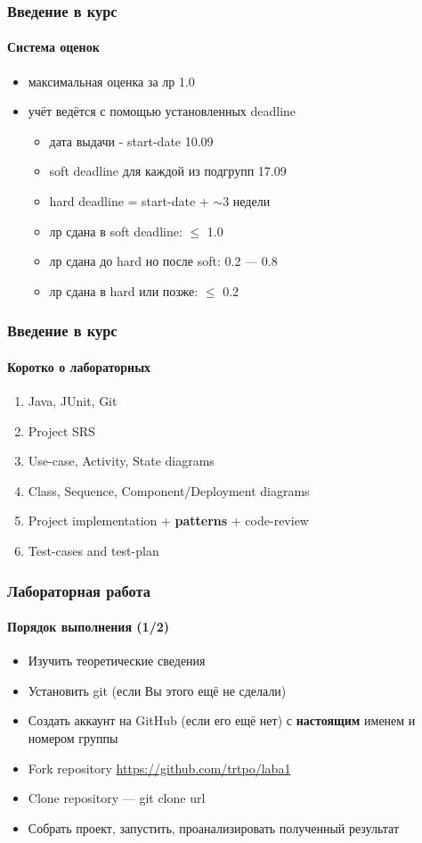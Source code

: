 \documentclass[aspectratio=169, 12pt]{beamer}
\begin{document}
\begin{frame}
    \frametitle{Введение в курс}
    \framesubtitle{Система оценок}
    \begin{itemize}
        \item максимальная оценка за лр 1.0 \pause
        \item учёт ведётся с помощью установленных deadline \pause
        \begin{itemize}
            \item дата выдачи - start-date 10.09 \pause
            \item soft deadline для каждой из подгрупп 17.09 \pause
            \item hard deadline = start-date + $\sim$3 недели \pause
            \item лр сдана в soft deadline: $\leq$ 1.0
            \item лр сдана до hard но после soft: 0.2 --- 0.8
            \item лр сдана в hard или позже: $\leq$ 0.2
        \end{itemize}
    \end{itemize}
\end{frame}

\begin{frame}
    \frametitle{Введение в курс}
    \framesubtitle{Коротко о лабораторных} \pause
    \begin{enumerate}
        \item Java, JUnit, Git \pause
        \item Project SRS \pause
        \item Use-case, Activity, State diagrams \pause
        \item Class, Sequence, Component/Deployment diagrams \pause
        \item Project implementation + \textbf{patterns} + code-review \pause
        \item Test-cases and test-plan
    \end{enumerate}
\end{frame}

\begin{frame}[t]
    \frametitle{Лабораторная работа }
    \framesubtitle{Порядок выполнения (1/2)} \pause
    \begin{itemize}
        \item Изучить теоретические сведения \pause
        \item Установить git (если Вы этого ещё не сделали) \pause
        \item Создать аккаунт на GitHub (если его ещё нет) с \textbf{настоящим} именем и номером группы \pause
        \item Fork repository \url{https://github.com/trtpo/laba1} \pause
        \item Clone repository --- git clone url \pause
        \item Собрать проект, запустить, проанализировать полученный результат
    \end{itemize}
\end{frame}
\end{document}

